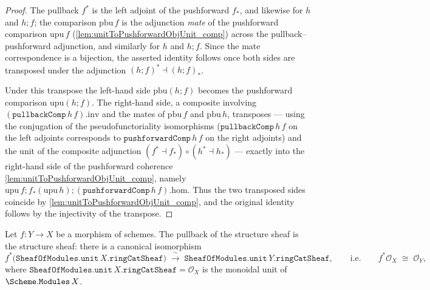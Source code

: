 \begin{proof}
  \leanok
  The pullback \(f^*\) is the left adjoint of the pushforward \(f_*\), and likewise for
  \(h\) and \(h \mathbin{;} f\); the comparison \(\mathrm{pbu}\,f\) is the adjunction
  \emph{mate} of the pushforward comparison \(\mathrm{upu}\,f\)
  (\cref{lem:unitToPushforwardObjUnit_comp}) across the pullback--pushforward adjunction,
  and similarly for \(h\) and \(h \mathbin{;} f\). Since the mate correspondence is a
  bijection, the asserted identity follows once both sides are transposed under the
  adjunction \((h \mathbin{;} f)^* \dashv (h \mathbin{;} f)_*\).

  Under this transpose the left-hand side \(\mathrm{pbu}(h \mathbin{;} f)\) becomes the
  pushforward comparison \(\mathrm{upu}(h \mathbin{;} f)\). The right-hand side, a
  composite involving \((\mathtt{pullbackComp}\,h\,f).\mathrm{inv}\) and the mates of
  \(\mathrm{pbu}\,f\) and \(\mathrm{pbu}\,h\), transposes --- using the conjugation of the
  pseudofunctoriality isomorphisms (\(\mathtt{pullbackComp}\,h\,f\) on the left adjoints
  corresponds to \(\mathtt{pushforwardComp}\,h\,f\) on the right adjoints) and the unit of
  the composite adjunction \((f^* \dashv f_*) \circ (h^* \dashv h_*)\) --- exactly into the
  right-hand side of the pushforward coherence
  \cref{lem:unitToPushforwardObjUnit_comp}, namely
  \(\mathrm{upu}\,f \mathbin{;} f_*(\mathrm{upu}\,h) \mathbin{;}
  (\mathtt{pushforwardComp}\,h\,f).\mathrm{hom}\). Thus the two transposed sides coincide
  by \cref{lem:unitToPushforwardObjUnit_comp}, and the original identity follows by the
  injectivity of the transpose.
\end{proof}

\begin{lemma}


  \label{lem:pullback_unit_iso}
  Let \(f : Y \to X\) be a morphism of schemes. The pullback of the structure sheaf
  is the structure sheaf: there is a canonical isomorphism
  \[
    f^*\bigl(\mathtt{SheafOfModules.unit}\,X.\mathtt{ringCatSheaf}\bigr)
      \;\xrightarrow{\;\sim\;}\;
    \mathtt{SheafOfModules.unit}\,Y.\mathtt{ringCatSheaf},
    \qquad\text{i.e.}\qquad
    f^* \mathcal{O}_X \;\cong\; \mathcal{O}_Y,
  \]
  where \(\mathtt{SheafOfModules.unit}\,X.\mathtt{ringCatSheaf} = \mathcal{O}_X\) is
  the monoidal unit of \(\Scheme.\mathtt{Modules}\,X\).
\end{lemma}

